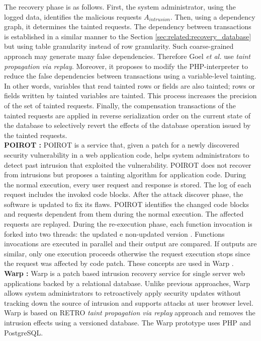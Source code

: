 The recovery phase is as follows. First, the system administrator, using the logged data, identifies the malicious requests $A_{intrusion}$. Then, using a dependency graph, it determines the tainted requests. The dependency between transactions is established in a similar manner to the Section \ref{sec:related:recovery_database} but using table granularity instead of row granularity. Such coarse-grained approach may generate many false dependencies. Therefore Goel \textit{et al.} use \textit{taint propagation via replay}. Moreover, it proposes to modify the PHP-interpreter to reduce the false dependencies between transactions using a variable-level tainting. In other words, variables that read tainted rows or fields are also tainted; rows or fields written by tainted variables are tainted. This process increases the precision of the set of tainted requests. Finally, the compensation transactions of the tainted requests are applied in reverse serialization order on the current state of the database to selectively revert the effects of the database operation issued by the tainted requests.\\ 

\textbf{POIROT \cite{poirot}:} POIROT is a service that, given a patch for a newly discovered security vulnerability in a web application code, helps system administrators to detect past intrusion that exploited the vulnerability. POIROT does not recover from intrusions but proposes a tainting algorithm for application code. During the normal execution, every user request and response is stored. The log of each request includes the invoked code blocks. After the attack discover phase, the software is updated to fix its flaws. POIROT identifies the changed code blocks and requests dependent from them during the normal execution. The affected requests are replayed. During the re-execution phase, each function invocation is forked into two threads: the updated e non-updated version \cite{Wang2011}. Functions invocations are executed in parallel and their output are compared. If outputs are similar, only one execution proceeds otherwise the request execution stops since the request was affected by code patch. These concepts are used in Warp \cite{warp}.\\


\textbf{Warp \cite{warp}:} Warp is a patch based intrusion recovery service for single server web applications backed by a relational database. Unlike previous approaches, Warp allows system administrators to retroactively apply security updates without tracking down the source of intrusion and supports attacks at user browser level. Warp is based on RETRO \cite{retro} \emph{taint propagation via replay} approach and removes the intrusion effects using a versioned database. The Warp prototype uses PHP and PostgreSQL. 

